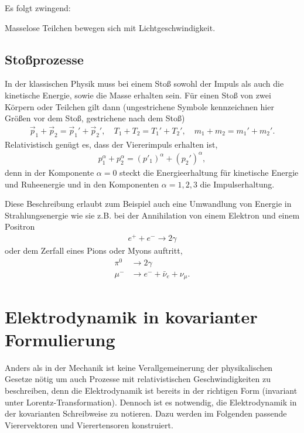 Es folgt zwingend:
\begin{formal}
    Masselose Teilchen bewegen sich mit Lichtgeschwindigkeit\footnotemark.
\end{formal}



\subsection{Stoßprozesse}


In der klassischen Physik muss bei einem Stoß sowohl der Impuls als auch die kinetische Energie, sowie die Masse erhalten sein.
Für einen Stoß von zwei Körpern oder Teilchen gilt dann (ungestrichene Symbole kennzeichnen hier Größen vor dem Stoß, gestrichene nach dem Stoß)
\begin{align*}
    \vec p_1 +\vec p_2 = \vec p_1'+\vec p_2', \quad T_1+T_2=T_1'+T_2', \quad m_1+m_2=m_1'+m_2'.
\end{align*}
Relativistisch genügt es, dass der Viererimpuls erhalten ist,
\begin{align*}
    p_1^\alpha+p_2^\alpha =(p'_1)^\alpha + (p_2')^\alpha,
\end{align*}
denn in der Komponente $\alpha=0$ steckt die Energieerhaltung für kinetische Energie und Ruheenergie
und in den Komponenten $\alpha=1,2,3$ die Impulserhaltung.

Diese Beschreibung erlaubt zum Beispiel auch eine Umwandlung von Energie in Strahlungsenergie wie sie z.B. bei der Annihilation von einem Elektron und einem Positron
\begin{align*}
    e^+ +e^- \rightarrow2\gamma
\end{align*}
oder dem Zerfall eines Pions oder Myons auftritt,
\begin{align*}
    \pi^0 & \rightarrow2\gamma                     \\
    \mu^- & \rightarrow e^- + \bar{\nu}_e+\nu_\mu.
\end{align*}






\section{Elektrodynamik in kovarianter Formulierung}

Anders als in der Mechanik ist keine Verallgemeinerung der physikalischen Gesetze nötig um auch Prozesse mit relativistischen Geschwindigkeiten zu beschreiben, denn die Elektrodynamik ist bereits in der richtigen Form (invariant unter Lorentz-Transformation).
Dennoch ist es notwendig, die Elektrodynamik in der kovarianten Schreibweise zu notieren.
Dazu werden im Folgenden passende Vierervektoren und Vierertensoren konstruiert.



